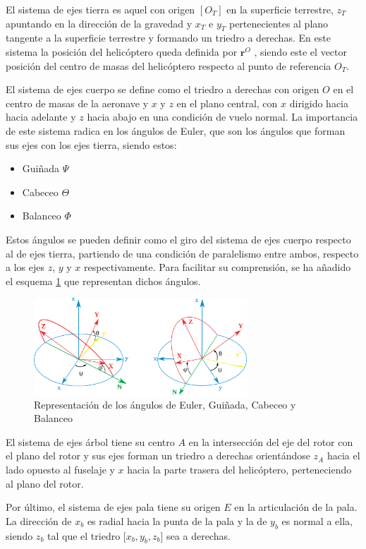 El sistema de ejes tierra es aquel con origen $[O_{T}]$ en la superficie terrestre, $z_{T}$ apuntando en la dirección de la gravedad y $x_{T}$ e $y_{T}$ pertenecientes al plano tangente a la superficie terrestre y formando un triedro a derechas. En este sistema la posición del helicóptero queda definida por $\textbf{r}^{O}$ , siendo este el vector posición del centro de masas del helicóptero respecto al punto de referencia $O_{T}$.

El sistema de ejes cuerpo se define como el triedro a derechas con origen $O$ en el centro de masas de la aeronave y $x$ y $z$ en el plano central, con $x$ dirigido hacia hacia adelante y $z$ hacia abajo en una condición de vuelo normal. La importancia de este sistema radica en los ángulos de Euler, que son los ángulos que forman sus ejes con los ejes tierra, siendo estos:
\begin{itemize}
	\item Guiñada $\Psi$
	\item Cabeceo $\Theta$
	\item Balanceo $\Phi$
\end{itemize}

Estos ángulos se pueden definir como el giro del sistema de ejes cuerpo respecto al de ejes tierra, partiendo de una condición de paralelismo entre ambos, respecto a los ejes $z$, $y$ y $x$ respectivamente. Para facilitar su comprensión, se ha añadido el esquema \ref{AEuler} que representan dichos ángulos.
\begin{figure}
	\centering
	\includegraphics[width=80mm]{imagenes/AEuler}
	\caption{Representación de los ángulos de Euler, Guiñada, Cabeceo y Balanceo}
	\label{AEuler}
\end{figure}

El sistema de ejes árbol tiene su centro $A$ en la intersección del eje del rotor con el plano del rotor y sus ejes forman un triedro a derechas orientándose $z_{A}$ hacia el lado opuesto al fuselaje y $x$ hacia la parte trasera del helicóptero, perteneciendo al plano del rotor.

Por último, el sistema de ejes pala tiene su origen $E$ en la articulación de la pala. La dirección de $x_{b}$ es radial hacia la punta de la pala y la de $y_{b}$ es normal a ella, siendo $z_{b}$ tal que el triedro [$x_{b},y_{b},z_{b}$] sea a derechas.

